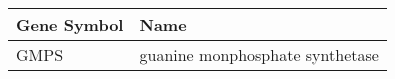 \begin{tabular}{ll}
\toprule
Gene Symbol &                            Name \\
\midrule
       GMPS & guanine monphosphate synthetase \\
\bottomrule
\end{tabular}

